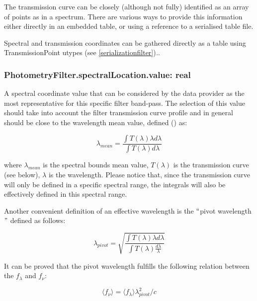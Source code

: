 \documentclass[11pt,a4paper]{ivoa}
\begin{document}
The transmission curve can be closely (although not fully) identified as an array 
of points as in a spectrum. There are various ways to provide this information 
either directly in an embedded table, or using a reference to a serialised table 
file.
\par

Spectral and transmission coordinates can be gathered directly as a table using 
TransmissionPoint utypes (see \ref{serializationfilter})\textit{.}.
\par

\subsubsection{PhotometryFilter.spectralLocation.value: real}
A spectral coordinate value that can be considered by the data provider as the 
most representative for this specific filter band-pass. The selection of this 
value should take into account the filter transmission curve profile and in 
general should be close to the wavelength mean value, defined 
(\citep{1982AJ.....87..670O}) as:
\par
\begin{equation} \label{eq:16}
\lambda_{mean} = \frac{\int T(\lambda)\lambda d\lambda}{\int T(\lambda)d\lambda}
\end{equation}

where $\lambda_{mean}$ is the spectral bounds mean value, $T(\lambda)$ is 
the transmission curve (see below), $\lambda$ is the wavelength. Please 
notice that, since the transmission curve will only be defined in a specific 
spectral range, the integrals will also be effectively defined in this 
spectral range.
\par

Another convenient definition of an effective wavelength is the 
$``$pivot wavelength$"$  defined as follows:

\begin{equation} \label{eq:17}
\lambda_{pivot} = \sqrt{\frac{\int T(\lambda)\lambda d\lambda}{\int T(\lambda)\frac{d\lambda}{\lambda}}}
\end{equation}

It can be proved that the pivot wavelength fulfills the following 
relation between the $f_\lambda$ and  $f_\nu $:

\begin{equation} \label{eq:18}
\langle f_\nu \rangle =\langle f_\lambda \rangle \lambda^2_{pivot}/c
\end{equation}
\end{document}
